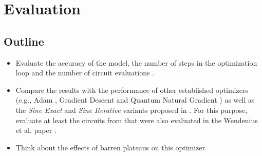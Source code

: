 \chapter{Evaluation}
\label{chap:evaluation}

\section{Outline}
\begin{itemize}
    \item
        Evaluate the accuracy of the model, the number of steps in the
        optimization loop and the number of circuit evaluations
        \cite{wendenius_gradient-free_2023,ostaszewski_structure_2021}.
    \item
        Compare the results with the performance of other established
        optimizers (e.g., Adam \cite{kingma_adam_2017}, Gradient Descent and
        Quantum Natural Gradient \cite{stokes_quantum_2020}) as well as the
        \emph{Sine Exact} and \emph{Sine Iterative} variants proposed in
        \cite{wendenius_gradient-free_2023}.
        For this purpose, evaluate at least the circuits from
        \cite{sim_expressibility_2019} that were also evaluated in the
        Wendenius et al. paper \cite{wendenius_gradient-free_2023}.
    \item
        Think about the effects of barren plateaus on this optimizer.
\end{itemize}
